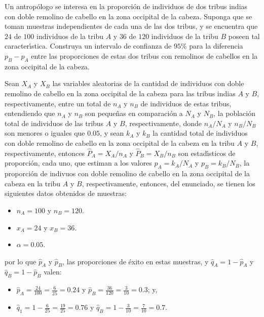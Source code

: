 \begin{enunciado}
 Un antrop\'ologo se interesa en la proporci\'on de individuos de dos tribus indias con doble remolino de cabello en la zona occipital de la cabeza. Suponga que se toman muestras independientes de cada una de las dos tribus, y se encuentra que $24$ de $100$ individuos de la tribu $A$ y $36$ de $120$ individuos de la tribu $B$ poseen tal caracter\'{\i}stica. Construya un intervalo de confianza de $95\%$ para la diferencia $p_B - p_A$ entre las proporciones de estas dos tribus con remolinos de cabellos en la zona occipital de la cabeza.
\end{enunciado}

\begin{solucion}
 Sean $X_A$ y $X_B$ las variables aleatorias de la cantidad de individuos con doble remolino de cabello en la zona occipital de la cabeza para las tribus indias $A$ y $B$, respectivamente, entre un total de $n_A$ y $n_B$ de individuos de estas tribus, entendiendo que $n_A$ y $n_B$ son peque\~nas en comparaci\'on a $N_A$ y $N_B$, la poblaci\'on total de individuos de las tribus $A$ y $B$, respectivamente, donde $n_A/N_A$ y $n_B/N_B$ son menores o iguales que $0.05$, y sean $k_A$ y $k_B$ la cantidad total de individuos con doble remolino de cabello en la zona occipital de la cabeza en la tribu $A$ y $B$, respectivamente, entonces $\widehat{P}_A = X_A/n_A$ y $\widehat{P}_B = X_B/n_B$ son estad\'{\i}sticos de proporci\'on, cada uno, que estiman a los valores $p_A = k_A/N_A$ y $p_B = k_B/N_B$, la proporci\'on de indivuos con doble remolino de cabello en la zona occipital de la cabeza en la tribu $A$ y $B$, respectivamente, entonces, del enunciado, se tienen los siguientes datos obtenidos de muestras:
 \begin{itemize}
  \item $n_A = 100$ y $n_B = 120$.
  \item $x_A = 24$ y $x_B = 36$.
  \item $\alpha = 0.05$.
 \end{itemize}
 por lo que $\hat{p}_A$ y $\hat{p}_B$, las proporciones de \'exito en estas muestras, y $\hat{q}_A = 1 - \hat{p}_A$ y $\hat{q}_B = 1 - \hat{p}_B$ valen:
 \begin{itemize}
  \item $\hat{p}_A = \frac{24}{100} = \frac{6}{25} = 0.24$ y $\hat{p}_B = \frac{36}{120} = \frac{3}{10} = 0.3$; y,
  \item $\hat{q}_1 = 1- \frac{6}{25} = \frac{19}{25} = 0.76$ y $\hat{q}_B = 1 - \frac{3}{10} = \frac{7}{10} = 0.7$.

\end{itemize}
\end{solucion}
